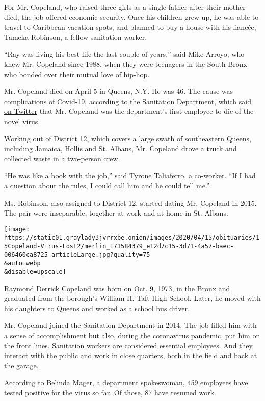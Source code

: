 For Mr. Copeland, who raised three girls as a single father after their
mother died, the job offered economic security. Once his children grew
up, he was able to travel to Caribbean vacation spots, and planned to
buy a house with his fiancée, Tameka Robinson, a fellow sanitation
worker.

``Ray was living his best life the last couple of years,'' said Mike
Arroyo, who knew Mr. Copeland since 1988, when they were teenagers in
the South Bronx who bonded over their mutual love of hip-hop.

Mr. Copeland died on April 5 in Queens, N.Y. He was 46. The cause was
complications of Covid-19, according to the Sanitation Department, which
\href{https://twitter.com/NYCSanitation/status/1247554105096224769}{said
on Twitter} that Mr. Copeland was the department's first employee to die
of the novel virus.

Working out of District 12, which covers a large swath of southeastern
Queens, including Jamaica, Hollis and St. Albans, Mr. Copeland drove a
truck and collected waste in a two-person crew.

``He was like a book with the job,'' said Tyrone Taliaferro, a
co-worker. ``If I had a question about the rules, I could call him and
he could tell me.''

Ms. Robinson, also assigned to District 12, started dating Mr. Copeland
in 2015. The pair were inseparable, together at work and at home in St.
Albans.

\texttt{[image: https://static01.graylady3jvrrxbe.onion/images/2020/04/15/obituaries/15Copeland-Virus-Lost2/merlin\_171584379\_e12d7c15-3d71-4a57-baec-006460ca8725-articleLarge.jpg?quality=75\\\&auto=webp\\\&disable=upscale]}

Raymond Derrick Copeland was born on Oct. 9, 1973, in the Bronx and
graduated from the borough's William H. Taft High School. Later, he
moved with his daughters to Queens and worked as a school bus driver.

Mr. Copeland joined the Sanitation Department in 2014. The job filled
him with a sense of accomplishment but also, during the coronavirus
pandemic, put him
\href{https://www.nytimes3xbfgragh.onion/2020/03/30/opinion/coronavirus-worker-strike.html}{on
the front lines.} Sanitation workers are considered essential employees.
And they interact with the public and work in close quarters, both in
the field and back at the garage.

According to Belinda Mager, a department spokeswoman, 459 employees have
tested positive for the virus so far. Of those, 87 have resumed work.

